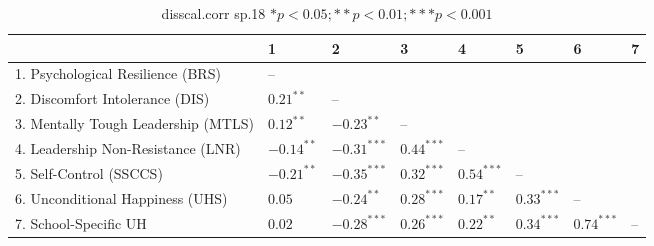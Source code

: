 \begin{table}[ht]
\centering
\begin{tabular}{llllllll}
  \hline
 & 1 & 2 & 3 & 4 & 5 & 6 & 7 \\ 
  \hline
1. Psychological Resilience (BRS) & -- &  &  &  &  &  &  \\ 
  2. Discomfort Intolerance (DIS) & $0.21^{**}$ & -- &  &  &  &  &  \\ 
  3. Mentally Tough Leadership (MTLS) & $0.12^{**}$ & $-0.23^{**}$ & -- &  &  &  &  \\ 
  4. Leadership Non-Resistance (LNR) & $-0.14^{**}$ & $-0.31^{***}$ & $0.44^{***}$ & -- &  &  &  \\ 
  5. Self-Control (SSCCS) & $-0.21^{**}$ & $-0.35^{***}$ & $0.32^{***}$ & $0.54^{***}$ & -- &  &  \\ 
  6. Unconditional Happiness (UHS) & $0.05$ & $-0.24^{**}$ & $0.28^{***}$ & $0.17^{**}$ & $0.33^{***}$ & -- &  \\ 
  7. School-Specific UH & $0.02$ & $-0.28^{***}$ & $0.26^{***}$ & $0.22^{**}$ & $0.34^{***}$ & $0.74^{***}$ & -- \\ 
   \hline
\end{tabular}
\caption{disscal.corr sp.18 $* p < 0.05; ** p < 0.01; *** p < 0.001$} 
\label{freq_corr.disscal.corr.sp.18}
\end{table}
